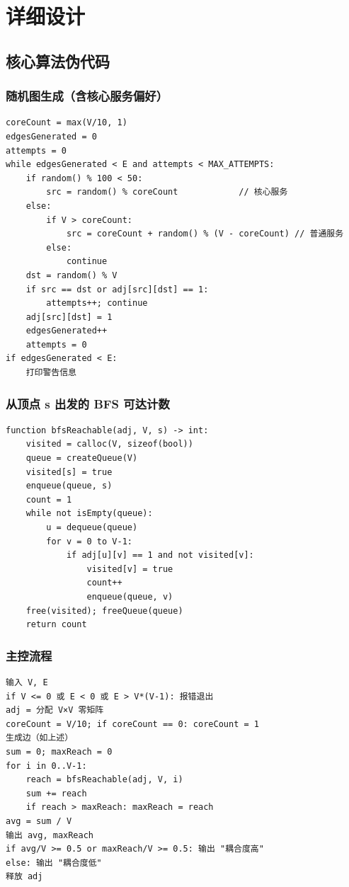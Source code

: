 \documentclass[UTF8]{ctexart}
\begin{document}
\section{详细设计}

\subsection{核心算法伪代码}

\subsubsection{随机图生成（含核心服务偏好）}
\begin{lstlisting}
coreCount = max(V/10, 1)
edgesGenerated = 0
attempts = 0
while edgesGenerated < E and attempts < MAX_ATTEMPTS:
    if random() % 100 < 50:
        src = random() % coreCount            // 核心服务
    else:
        if V > coreCount:
            src = coreCount + random() % (V - coreCount) // 普通服务
        else:
            continue
    dst = random() % V
    if src == dst or adj[src][dst] == 1:
        attempts++; continue
    adj[src][dst] = 1
    edgesGenerated++
    attempts = 0
if edgesGenerated < E:
    打印警告信息
\end{lstlisting}

\subsubsection{从顶点 s 出发的 BFS 可达计数}
\begin{lstlisting}
function bfsReachable(adj, V, s) -> int:
    visited = calloc(V, sizeof(bool))
    queue = createQueue(V)
    visited[s] = true
    enqueue(queue, s)
    count = 1
    while not isEmpty(queue):
        u = dequeue(queue)
        for v = 0 to V-1:
            if adj[u][v] == 1 and not visited[v]:
                visited[v] = true
                count++
                enqueue(queue, v)
    free(visited); freeQueue(queue)
    return count
\end{lstlisting}

\subsubsection{主控流程}
\begin{lstlisting}
输入 V, E
if V <= 0 或 E < 0 或 E > V*(V-1): 报错退出
adj = 分配 V×V 零矩阵
coreCount = V/10; if coreCount == 0: coreCount = 1
生成边（如上述）
sum = 0; maxReach = 0
for i in 0..V-1:
    reach = bfsReachable(adj, V, i)
    sum += reach
    if reach > maxReach: maxReach = reach
avg = sum / V
输出 avg, maxReach
if avg/V >= 0.5 or maxReach/V >= 0.5: 输出 "耦合度高"
else: 输出 "耦合度低"
释放 adj
\end{lstlisting}
\end{document}
